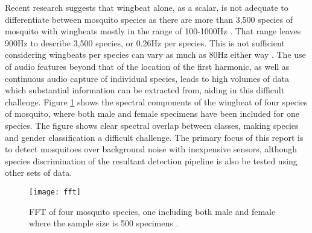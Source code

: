         Recent research suggests that wingbeat alone, as a scalar, is not adequate to differentiate between mosquito species as there are more than 3,500 species of mosquito with wingbeats mostly in the range of 100-1000Hz \cite{Chen2014}. That range leaves 900Hz to describe 3,500 species, or 0.26Hz per species. This is not sufficient considering wingbeats per species can vary as much as 80Hz either way \cite{Arthur2014}. The use of audio features beyond that of the location of the first harmonic, as well as continuous audio capture of individual species, leads to high volumes of data which substantial information can be extracted from, aiding in this difficult challenge. Figure \ref{fig:bg-litreview-mozz-fft} shows the spectral components of the wingbeat of four species of mosquito, where both male and female specimens have been included for one species. The figure shows clear spectral overlap between classes, making species and gender classification a difficult challenge. The primary focus of this report is to detect mosquitoes over background noise with inexpensive sensors, although species discrimination of the resultant detection pipeline is also be tested using other sets of data.
        \begin{figure}
            \centering
            \texttt{[image: fft]}
            \caption{FFT of four mosquito species, one including both male and female where the sample size is 500 specimens \cite{Chen2014}.}
            \label{fig:bg-litreview-mozz-fft}
        \end{figure}
    

    
